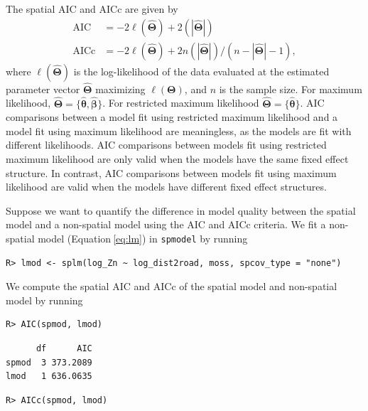 \documentclass{article}
\begin{document}
The spatial AIC and AICc are given by \begin{equation*}\label{eq:sp_aic}
  \begin{split}
    \text{AIC} & = -2\ell(\hat{\boldsymbol{\Theta}}) + 2(|\hat{\boldsymbol{\Theta}}|) \\
    \text{AICc} & = -2\ell(\hat{\boldsymbol{\Theta}}) + 2n(|\hat{\boldsymbol{\Theta}}|) / (n - |\hat{\boldsymbol{\Theta}}| - 1),
  \end{split}
\end{equation*} where \(\ell(\hat{\boldsymbol{\Theta}})\) is the
log-likelihood of the data evaluated at the estimated parameter vector
\(\hat{\boldsymbol{\Theta}}\) maximizing \(\ell(\boldsymbol{\Theta})\),
and \(n\) is the sample size. For maximum likelihood,
\(\hat{\boldsymbol{\Theta}} = \{\hat{\boldsymbol{\theta}}, \hat{\boldsymbol{\beta}}\}\).
For restricted maximum likelihood
\(\hat{\boldsymbol{\Theta}} = \{\hat{\boldsymbol{\theta}}\}\). AIC
comparisons between a model fit using restricted maximum likelihood and
a model fit using maximum likelihood are meaningless, as the models are
fit with different likelihoods. AIC comparisons between models fit using
restricted maximum likelihood are only valid when the models have the
same fixed effect structure. In contrast, AIC comparisons between models
fit using maximum likelihood are valid when the models have different
fixed effect structures.

Suppose we want to quantify the difference in model quality between the
spatial model and a non-spatial model using the AIC and AICc criteria.
We fit a non-spatial model (Equation\(~\)\ref{eq:lm}) in
\texttt{spmodel} by running

\begin{verbatim}
R> lmod <- splm(log_Zn ~ log_dist2road, moss, spcov_type = "none")
\end{verbatim}

We compute the spatial AIC and AICc of the spatial model and non-spatial
model by running

\begin{verbatim}
R> AIC(spmod, lmod)
\end{verbatim}

\begin{verbatim}
      df      AIC
spmod  3 373.2089
lmod   1 636.0635
\end{verbatim}

\begin{verbatim}
R> AICc(spmod, lmod)
\end{verbatim}
\end{document}
